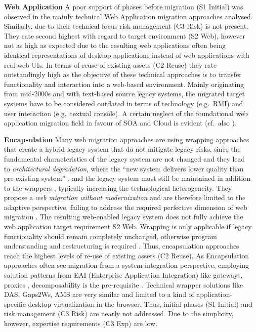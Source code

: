 \textbf{Web Application} A poor support of phases before migration (S1 Initial) was observed in the mainly technical Web Application migration approaches analysed.
Similarly, due to their technical focus risk management (C3 Risk) is not present.
They rate second highest with regard to target environment (S2 Web), however not as high as expected due to the resulting web applications often being identical representations of desktop applications instead of web applications with real web UIs.
In terms of reuse of existing assets (C2 Reuse) they rate outstandingly high as the objective of these technical approaches is to transfer functionality and interaction into a web-based environment.
Mainly originating from mid-2000s and with text-based source legacy systems, the migrated target systems have to be considered outdated in terms of technology (e.g.~RMI) and user interaction (e.g.~textual console).
A certain neglect of the foundational web application migration field in favour of SOA and Cloud is evident (cf.~also \autocite{Heil2017Survey}).

\textbf{Encapsulation} Many web migration approaches are using wrapping approaches that create a hybrid legacy system that do not mitigate legacy risks, since the fundamental characteristics of the legacy system are not changed \autocite{Almonaies2010SOAStrategies} and they lead to \emph{architectural degradation}, where the ``new system delivers lower quality than pre-existing system'' \autocite{Razavian2010SAPIENSA}, and the legacy system must still be maintained in addition to the wrappers \autocite{Fuhr2013SOAMIG}, typically increasing the technological heterogeneity.
They propose a \emph{web migration without modernization} and are therefore limited to the adaptive perspective, failing to address the required perfective dimension of web migration \autocite{ISO/IEEE2006SoftwareLifeCycle}.
The resulting web-enabled legacy system does not fully achieve the web application target requirement S2 Web.
Wrapping is only applicable if legacy functionality should remain completely unchanged, otherwise program understanding and restructuring is required \autocite{Stroulia2002}.
Thus, encapsulation approaches reach the highest levels of re-use of existing assets (C2 Reuse).
As Encapsulation approaches often see migration from a system integration perspective, employing solution patterns from EAI (Enterprise Application Integration) like gateways, proxies \autocite{Karampaglis2014,Bodhuin2003}, decomposability is the pre-requisite \autocite{Wagner2014Fundamentals,Khadka2016PHD,Khadka2013SurveySOAMigration,Lucia2008,Lucia2006}.
Technical wrapper solutions like DAS, Gaps2Ws, AMS are very similar and limited to a kind of application-specific desktop virtualization in the browser.
Thus, initial phases (S1 Initial) and risk management (C3 Risk) are nearly not addressed.
Due to the simplicity, however, expertise requirements (C3 Exp) are low.

